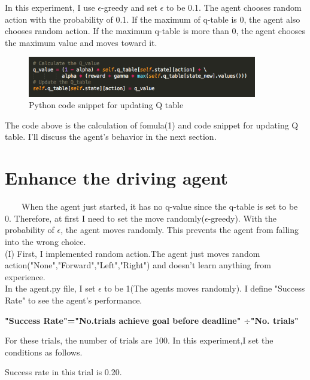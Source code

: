 \documentclass[a4paper,11pt]{article}
\begin{document}
In this experiment, I use $\epsilon$-greedy  and set $\epsilon$ to be 0.1. The agent chooses random action with the probability of 0.1. If the maximum of q-table is 0, the agent also chooses random action. If the maximum q-table is more than 0, the agent chooses the maximum value and moves toward it.


\begin{figure}[H]
\begin{center}
\includegraphics[width=100mm]{graph/python_code2.jpg}
\end{center}
\caption{Python code snippet for updating Q table}
\label{fig:2}
\end{figure}
The code above is the calculation of fomula(1) and code snippet for updating Q table.
I'll discuss the agent's behavior in the next section.








\section{Enhance the driving agent}
\ \ \ \ When the agent just started, it has no q-value since the q-table is set to be 0. Therefore, at first I need to set the move randomly($\epsilon$-greedy).
With the probability of $\epsilon$, the agent moves randomly. This prevents the agent from falling into the wrong choice. 
\\


(I) First, I implemented random action.The agent just moves random action("None","Forward","Left","Right") and doesn't learn anything from experience.
\\
In the agent.py file, I set $\epsilon$ to be 1(The agents moves randomly).
I define "Success Rate" to see the agent's performance.


{\bf "Success Rate"="No.trials achieve goal before deadline" $\div$"No. trials"}



For these trials, the number of trials are 100.
In this experiment,I set the conditions as follows.


Success rate in this trial is 0.20.
\end{document}

